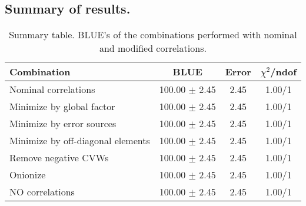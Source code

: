 \subsection{Summary of results.}
\begin{table}[h]
\scriptsize
\begin{center}
\renewcommand{\arraystretch}{1.1}
\begin{tabular}{|l|c|c|c|}
\hline
Combination & BLUE & {\tiny Error} & {\tiny$\chi^2$/ndof} \\
\hline
Nominal correlations &     100.00 $\pm$      2.45 &       2.45 &       1.00/1\\
\hline
Minimize by global factor &     100.00 $\pm$      2.45 &       2.45 &       1.00/1\\
Minimize by error sources &     100.00 $\pm$      2.45 &       2.45 &       1.00/1\\
Minimize by off-diagonal elements &     100.00 $\pm$      2.45 &       2.45 &       1.00/1\\
Remove negative CVWs &     100.00 $\pm$      2.45 &       2.45 &       1.00/1\\
Onionize &     100.00 $\pm$      2.45 &       2.45 &       1.00/1\\
\hline
NO correlations &     100.00 $\pm$      2.45 &       2.45 &       1.00/1\\
\hline
\end{tabular}
\renewcommand{\arraystretch}{1}
\caption{Summary table. BLUE's of the combinations performed with nominal and modified correlations.}
\end{center}
\end{table}

\clearpage
